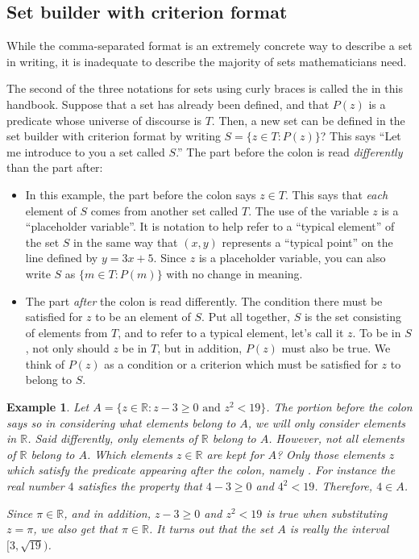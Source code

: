 \documentclass{book}
\newcounter{ekcounter}%
\theoremstyle{ekimcustom}
\newtheorem{example}[ekcounter]{Example}
\newcommand\defn[1]{{\color{blue}{\bf #1}}}
\begin{document}
\subsection{Set builder with criterion format}

While the comma-separated format is an extremely concrete way to describe a set in writing, it is inadequate to describe the majority of sets mathematicians need.

The second of the three notations for sets using curly braces is called the \defn{set builder with criterion format} in this handbook. Suppose that a set has already been defined, and that $P(z)$ is a predicate whose universe of discourse is $T$. Then, a new set can be defined in the set builder with criterion format by writing $S=\{z \in T : P(z)\}$? This says ``Let me introduce to you a set called $S$.'' The part before the colon is read \emph{differently} than the part after:
\begin{itemize}
\item In this example, the part before the colon says $z \in T$. This says that \emph{each} element of $S$ comes from another set called $T$. The use of the variable $z$ is a ``placeholder variable''. It is notation to help refer to a ``typical element'' of the set $S$ in the same way that $(x,y)$ represents a ``typical point'' on the line defined by $y=3x+5$. Since $z$ is a placeholder variable, you can also write $S$ as $\{m \in T : P(m)\}$ with no change in meaning.
\item The part \emph{after} the colon is read differently. The condition there must be satisfied for $z$ to be an element of $S$. Put all together, $S$ is the set consisting of elements from $T$, and to refer to a typical element, let's call it $z$. To be in $S$, not only should $z$ be in $T$, but in addition, $P(z)$ must also be true. We think of $P(z)$ as a condition or a criterion which must be satisfied for $z$ to belong to $S$.
\end{itemize}
\begin{example}
Let $A = \{z \in \mathbb{R} : z-3 \geq 0 \text{ and } z^2 < 19\}$. The portion before the colon says  so in considering what elements belong to $A$, we will only consider elements in $\mathbb{R}$. Said differently, only elements of $\mathbb{R}$ belong to $A$. However, not \emph{all} elements of $\mathbb{R}$ belong to $A$. Which elements $z \in \mathbb{R}$ are kept for $A$? Only those elements $z$ which satisfy the predicate appearing after the colon, namely . For instance the real number $4$ satisfies the property that $4-3 \geq 0$ and $4^2 < 19$. Therefore, $4 \in A$.

Since $\pi \in \mathbb{R}$, and in addition, $z-3 \geq 0$ and $z^2 < 19$ is true when substituting $z=\pi$, we also get that $\pi \in \mathbb{R}$. It turns out that the set $A$ is really the interval $[3,\sqrt{19})$.
\end{example}
\end{document}
